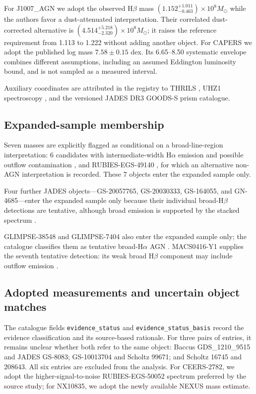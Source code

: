 \documentclass[pdflatex,sn-basic]{sn-jnl}
\begin{document}
For J1007\_AGN we adopt the observed H$\beta$ mass
$(1.152^{+1.011}_{-0.463})\times10^8 M_\odot$ while the authors favor a dust-attenuated interpretation. Their
correlated dust-corrected alternative is
$(4.514^{+5.218}_{-2.320})\times10^8 M_\odot$; it raises the reference
requirement from 1.113 to 1.222 without adding another object.
For CAPERS we adopt the published log mass $7.58\pm0.15$ dex. Its 6.65--8.50
systematic envelope combines different assumptions, including an assumed
Eddington luminosity bound, and is not sampled as a measured interval.

Auxiliary coordinates are attributed in the registry to THRILS
\citep{hutchison2025}, UHZ1 spectroscopy \citep{goulding2023}, and the versioned
JADES DR3 GOODS-S prism catalogue.

\subsection{Expanded-sample membership}
\label{app:expanded-membership}

Seven masses are explicitly flagged as conditional on a
broad-line-region interpretation: 6 candidates with intermediate-width
H$\alpha$ emission and possible outflow contamination \citep{ren2025}, and
RUBIES-EGS-49140 \citep{taylor2025},
for which an alternative non-AGN interpretation is recorded. These 7
objects enter the expanded sample only.


Four further JADES objects---GS-20057765,
GS-20030333, GS-164055, and GN-4685---enter the expanded sample only because
their individual broad-H$\beta$ detections are tentative, although broad emission
is supported by the stacked spectrum \citep{juodzbalis2026}.

GLIMPSE-38548 and GLIMPSE-7404 also enter the expanded sample only;
the catalogue classifies them as tentative broad-H$\alpha$ AGN \citep{fei2026}.
MACS0416-Y1 supplies the seventh tentative detection: its weak broad
H$\beta$ component may include outflow emission \citep{takechi26expansion}.


\subsection{Adopted measurements and uncertain object matches}
\label{app:identities}

The catalogue fields
\texttt{evidence\_status} and \texttt{evidence\_status\_basis} record the
evidence classification and its source-based rationale. For three pairs of entries,
it remains unclear whether both refer to the same object: Baccus
GDS\_1210\_9515 and JADES GS-8083; GS-10013704 and Scholtz 99671;
and Scholtz 16745 and 208643. All six entries are excluded from the analysis.
For CEERS-2782, we adopt the higher-signal-to-noise RUBIES-EGS-50052 spectrum
preferred by the source study; for NX10835, we adopt the newly available
NEXUS mass estimate.
\end{document}
